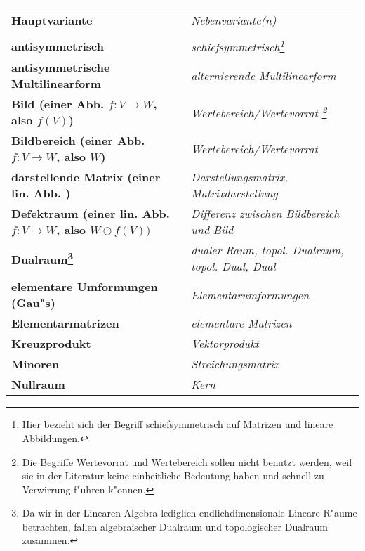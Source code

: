 \begin{minipage}{\linewidth}
\renewcommand{\thefootnote}{\thempfootnote}
\begin{tabular}{!{\vrule width 1pt} >{\bfseries}m{7.5cm} | >{\itshape}m{7.5cm} !{\vrule width 1pt}}
\hline
\hline
 & \\
Hauptvariante & Nebenvariante(n)\\
 & \\
\hline
\hline
antisymmetrisch & schiefsymmetrisch\footnote{Hier bezieht sich der Begriff
  schiefsymmetrisch auf Matrizen und lineare Abbildungen.}\\
\hline
antisymmetrische Multilinearform & alternierende Multilinearform\\
\hline
Bild \newline(einer Abb. $f:V\rightarrow W$, also $f(V)$) & Wertebereich/Wertevorrat
\footnote{Die Begriffe Wertevorrat und Wertebereich sollen nicht benutzt werden, weil
  sie in der Literatur keine einheitliche Bedeutung haben und schnell zu Verwirrung f"uhren
  k"onnen.} \\
\hline
Bildbereich \newline(einer Abb. $f:V\rightarrow W$, also $W$)& Wertebereich/Wertevorrat \\
\hline
darstellende Matrix (einer lin. Abb. ) & Darstellungsmatrix, Matrixdarstellung \\ 
\hline
Defektraum \newline(einer lin. Abb. $f:V\rightarrow W$, also \newline$W\ominus f(V))$& Differenz zwischen Bildbereich und Bild\\
\hline
Dualraum\footnote{Da wir in der Linearen Algebra lediglich endlichdimensionale Lineare R"aume
  betrachten, fallen algebraischer Dualraum und topologischer Dualraum zusammen.} & dualer Raum, topol. Dualraum, topol. Dual, Dual\\
\hline
elementare Umformungen (Gau"s) & Elementarumformungen%
\\
\hline
Elementarmatrizen & elementare Matrizen\\
\hline
Kreuzprodukt & Vektorprodukt \\
\hline
Minoren  & Streichungsmatrix\\
\hline
Nullraum & Kern \\

\end{tabular}
\end{minipage}
